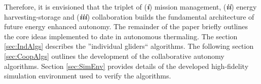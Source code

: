 \documentclass{ifacconf}
\begin{document}
Therefore, it is envisioned that the triplet of (\emph{\textbf{i}}) mission management,
(\emph{\textbf{ii}}) energy harvesting-storage and (\emph{\textbf{iii}})
collaboration builds the fundamental architecture of future energy enhanced
autonomy.
%
The remainder of the paper briefly outlines the core ideas implemented to
date in autonomous thermaling. The section \ref{sec:IndAlgs} describes the
''individual gliders`` algorithms. The following section \ref{sec:CoopAlgs}
outlines the development of the collaborative autonomy algorithms. Section
\ref{sec:SimEnv} provides details of the developed high-fidelity simulation
environment used to verify the algorithms.
\end{document}
